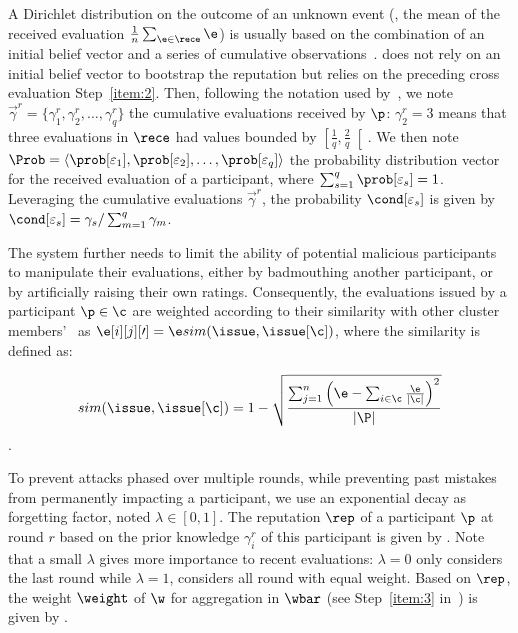 A Dirichlet distribution on the outcome of an unknown event (\ie, the mean of the received evaluation $\frac{1}{n}\sum_{\e \in \rece} \e$) is usually based on the combination of an initial belief vector and a series of cumulative observations~\cite{fung_dirichlet-based_2011}. 
\thecontrib does not rely on an initial belief vector to bootstrap the reputation but relies on the preceding cross evaluation Step~\ref{item:2}. 
Then, following the notation used by~\citet{fung_dirichlet-based_2011}, we note $\vec{\gamma}^r = \{\gamma_{1}^r,\gamma_{2}^r,\ldots,\gamma_{q}^r\}$ the cumulative evaluations received by $\p$: $\gamma_{2}^r=3$ means that three evaluations in $\rece$ had values bounded by $\left[\frac{1}{q},\frac{2}{q}\right[$.
We then note $\Prob = {\langle\prob[\varepsilon_1],\prob[\varepsilon_2], \ldots, \prob[\varepsilon_q]\rangle}$ the probability distribution vector for the received evaluation of a participant, where $\sum_{s=1}^{q}\prob[\varepsilon_s] = 1$.
Leveraging the cumulative evaluations $\vec{\gamma}^r$, the probability $\cond[\varepsilon_s]$ is given by $\cond[\varepsilon_s] = \gamma_{s} / \sum_{m=1}^{q}{\gamma_{m}}$.

The system further needs to limit the ability of potential malicious participants to manipulate their evaluations, either by badmouthing another participant, or by artificially raising their own ratings.
Consequently, the evaluations issued by a participant $\p \in \c$ are weighted according to their similarity with other cluster members'~\cite{xiong_peertrust_2004} as $\e[i][j][\prime] = \e sim(\issue,\issue[\c])$, where the similarity is defined as:

\begin{equation}\label{eq:sim_reput}
    sim(\issue,\issue[\c]) = 1 - \sqrt{
        \frac{
            \sum_{j=1}^{n}{
                {\left(\e - \sum_{i \in \c} \frac{\e}{|\c|}\right)}^{2}
            }
        }
        {
            |\P|
        }
    }
\end{equation}.


To prevent attacks phased over multiple rounds, while preventing past mistakes from permanently impacting a participant, we use an exponential decay as forgetting factor, noted $\lambda \in [0,1]$. The reputation $\rep$ of a participant $\p$ at round $r$ based on the prior knowledge $\gamma^r_i$ of this participant is given by .
Note that a small $\lambda$ gives more importance to recent evaluations: $\lambda=0$ only considers the last round while $\lambda=1$, considers all round with equal weight.  
Based on $\rep$, the weight $\weight$ of $\w$ for aggregation in $\wbar$ (see Step~\ref{item:3} in~) is given by .

